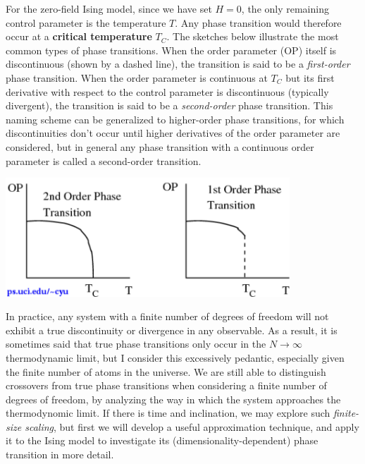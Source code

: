 For the zero-field Ising model, since we have set $H = 0$, the only remaining control parameter is the temperature $T$.
Any phase transition would therefore occur at a \textbf{critical temperature} $T_C$.
The sketches below illustrate the most common types of phase transitions.
When the order parameter (OP) itself is discontinuous (shown by a dashed line), the transition is said to be a \textit{first-order} phase transition. %
When the order parameter is continuous at $T_C$ but its first derivative with respect to the control parameter is discontinuous (typically divergent), the transition is said to be a \textit{second-order} phase transition.
This naming scheme can be generalized to higher-order phase transitions, for which discontinuities don't occur until higher derivatives of the order parameter are considered, but in general any phase transition with a continuous order parameter is called a second-order transition.

\begin{center}\includegraphics[width=0.8\textwidth]{figs/unit09_transitions.pdf}\end{center}

In practice, any system with a finite number of degrees of freedom will not exhibit a true discontinuity or divergence in any observable.
As a result, it is sometimes said that true phase transitions only occur in the $N \to \infty$ thermodynamic limit, but I consider this excessively pedantic, especially given the finite number of atoms in the universe.
We are still able to distinguish crossovers from true phase transitions when considering a finite number of degrees of freedom, by analyzing the way in which the system approaches the thermodynomic limit.
If there is time and inclination, we may explore such \textit{finite-size scaling}, but first we will develop a useful approximation technique, and apply it to the Ising model to investigate its (dimensionality-dependent) phase transition in more detail.



